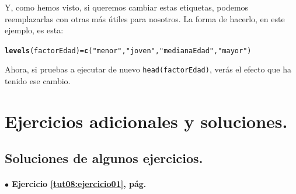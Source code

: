\documentclass[10pt,a4paper]{article}\usepackage[]{graphicx}\usepackage[]{color}
\makeatletter
\newcommand{\hlstr}[1]{\textcolor[rgb]{0.192,0.494,0.8}{#1}}%
\newcommand{\hlstd}[1]{\textcolor[rgb]{0.345,0.345,0.345}{#1}}%
\newcommand{\hlkwb}[1]{\textcolor[rgb]{0.69,0.353,0.396}{#1}}%
\newcommand{\hlkwd}[1]{\textcolor[rgb]{0.737,0.353,0.396}{\textbf{#1}}}%
\newenvironment{kframe}{%
 \def\at@end@of@kframe{}%
 \ifinner\ifhmode%
  \def\at@end@of@kframe{\end{minipage}}%
  \begin{minipage}{\columnwidth}%
 \fi\fi%
 \def\FrameCommand##1{\hskip\@totalleftmargin \hskip-\fboxsep
 \colorbox{shadecolor}{##1}\hskip-\fboxsep
     \hskip-\linewidth \hskip-\@totalleftmargin \hskip\columnwidth}%
 \MakeFramed {\advance\hsize-\width
   \@totalleftmargin\z@ \linewidth\hsize
   \@setminipage}}%
 {\par\unskip\endMakeFramed%
 \at@end@of@kframe}
\newenvironment{knitrout}{}{} %
\makeatother
\begin{document}
Y, como hemos visto,  si queremos cambiar estas etiquetas, podemos reemplazarlas con otras más útiles para nosotros. La forma de hacerlo, en este ejemplo, es esta:
\begin{knitrout}
\color{fgcolor}\begin{kframe}
\begin{alltt}
\hlkwd{levels}\hlstd{(factorEdad)} \hlkwb{=} \hlkwd{c}\hlstd{(}\hlstr{"menor"}\hlstd{,} \hlstr{"joven"}\hlstd{,} \hlstr{"medianaEdad"}\hlstd{,} \hlstr{"mayor"}\hlstd{)}
\end{alltt}
\end{kframe}
\end{knitrout}

Ahora, si pruebas a ejecutar de nuevo {\tt head(factorEdad)}, verás el efecto que ha tenido ese cambio. %



\section{Ejercicios adicionales y soluciones.}
\label{tut08:sec:EjerciciosAdicionalesYSoluciones}

%
%
%


\subsection*{Soluciones de algunos ejercicios.}
\label{tut08:subsec:SolucionesAlgunosEjercicios}


\paragraph{\bf $\bullet$ Ejercicio \ref{tut08:ejercicio01}, pág. \pageref{tut08:ejercicio01}}
\label{tut08:ejercicio01:sol}\quad\\
\end{document}
